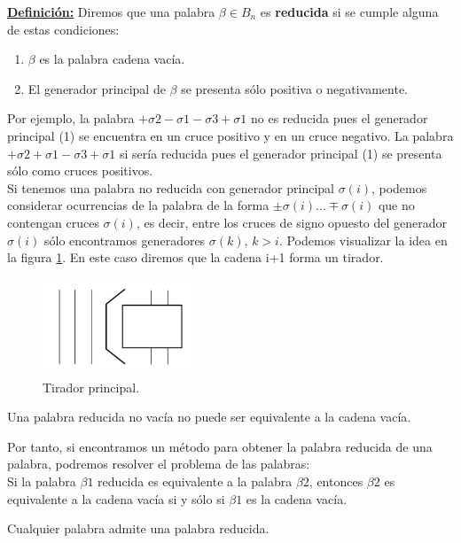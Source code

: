 \documentclass[14pt]{extarticle}
\begin{document}
\textbf{\underline{Definición:}}
Diremos que una palabra $\beta \in B_{n}$ es \textbf{reducida} si se cumple alguna de estas condiciones:
\begin{enumerate}
	\item $\beta$ es la palabra cadena vacía.
	\item El generador principal de $\beta$ se presenta sólo positiva o negativamente. 
\end{enumerate}
 
Por ejemplo, la palabra $+\sigma2-\sigma1-\sigma3+\sigma1$ no es reducida pues el generador principal (1) se encuentra en un cruce positivo y en un cruce negativo. La palabra $+\sigma2+\sigma1-\sigma3+\sigma1$ si sería reducida pues el generador principal (1) se presenta sólo como cruces positivos.\\

Si tenemos una palabra no reducida con generador principal $ \sigma(i) $, podemos considerar ocurrencias de la palabra de la forma $ \pm \sigma(i) ... \mp \sigma(i) $ que no contengan cruces $ \sigma(i) $, es decir, entre los cruces de signo opuesto del generador $ \sigma(i) $ sólo encontramos generadores $ \sigma(k) $, $ k>i $. Podemos visualizar la idea en la figura \ref{h1}. En este caso diremos que la cadena i+1 forma un tirador.\\
\begin{figure}[h!]
	\centering
	\includegraphics[width=4.5cm]{itrenzas/h11.png}
	\caption{Tirador principal.}
	\label{h1} 
\end{figure}

\begin{pro}
	Una palabra reducida no vacía no puede ser equivalente a la cadena vacía.
\end{pro}

Por tanto, si encontramos un método para obtener la palabra reducida de una palabra, podremos resolver el problema de las palabras: \\
Si la palabra $\beta1$ reducida es equivalente a la palabra $\beta2$, entonces $\beta2$ es equivalente a la cadena vacía si y sólo si $\beta1$ es la cadena vacía. \\

\begin{pro}
	Cualquier palabra admite una palabra reducida. 
\end{pro}
\end{document}
